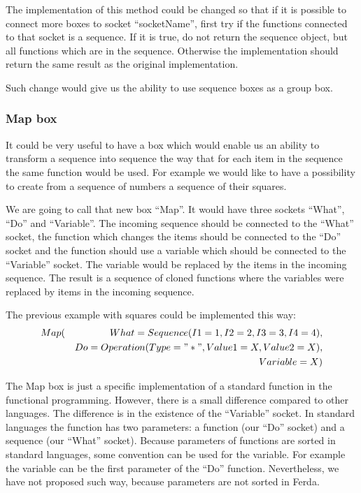 \documentclass[a4paper,12pt]{book}
\begin{document}
The implementation of this method could be changed so that if it is possible to connect more boxes to socket ``socketName'', first try if the functions connected to that socket is a sequence. If it is true, do not return the sequence object, but all functions which are in the sequence. Otherwise the implementation should return the same result as the original implementation.

Such change would give us the ability to use sequence boxes as a group box.

\subsubsection{Map box}
It could be very useful to have a box which would enable us an ability to transform a sequence into sequence the way that for each item in the sequence the same function would be used. For example we would like to have a possibility to create from a sequence of numbers a sequence of their squares. 

We are going to call that new box ``Map''. It would have three sockets ``What'', ``Do'' and ``Variable''. The incoming sequence should be connected to the ``What'' socket, the function which changes the items should be connected to the ``Do'' socket and the function should use a variable which should be connected to the ``Variable'' socket. The variable would be replaced by the items in the incoming sequence. The result is a sequence of cloned functions where the variables were replaced by items in the incoming sequence.

The previous example with squares could be implemented this way:
\begin{eqnarray*}
Map(&&What=Sequence(I1=1,I2=2,I3=3,I4=4), \\&& Do=Operation(Type="*", Value1=X, Value2=X), \\&& Variable=X)
\end{eqnarray*}

The Map box is just a specific implementation of a standard function in the functional programming. However, there is a small difference compared to other languages. The difference is in the existence of the ``Variable'' socket. In standard languages the function has two parameters: a function (our ``Do'' socket) and a sequence (our ``What'' socket). Because parameters of functions are sorted in standard languages, some convention can be used for the variable. For example the variable can be the first parameter of the ``Do'' function. Nevertheless, we have not proposed such way, because parameters are not sorted in Ferda.
\end{document}
